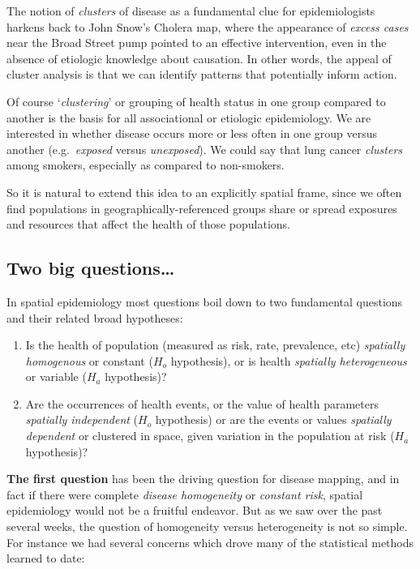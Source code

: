 \documentclass[
]{book}
\providecommand{\tightlist}{%
  \setlength{\itemsep}{0pt}\setlength{\parskip}{0pt}}
\begin{document}
The notion of \emph{clusters} of disease as a fundamental clue for epidemiologists harkens back to John Snow's Cholera map, where the appearance of \emph{excess cases} near the Broad Street pump pointed to an effective intervention, even in the absence of etiologic knowledge about causation. In other words, the appeal of cluster analysis is that we can identify patterns that potentially inform action.

Of course `\emph{clustering}' or grouping of health status in one group compared to another is the basis for all associational or etiologic epidemiology. We are interested in whether disease occurs more or less often in one group versus another (e.g.~\emph{exposed} versus \emph{unexposed}). We could say that lung cancer \emph{clusters} among smokers, especially as compared to non-smokers.

So it is natural to extend this idea to an explicitly spatial frame, since we often find populations in geographically-referenced groups share or spread exposures and resources that affect the health of those populations.

\hypertarget{two-big-questions}{%
\subsection{Two big questions\ldots{}}\label{two-big-questions}}

In spatial epidemiology most questions boil down to two fundamental questions and their related broad hypotheses:

\begin{enumerate}
\def\labelenumi{\arabic{enumi}.}
\tightlist
\item
  Is the health of population (measured as risk, rate, prevalence, etc) \emph{spatially homogenous} or constant (\(H_o\) hypothesis), or is health \emph{spatially heterogeneous} or variable (\(H_a\) hypothesis)?
\item
  Are the occurrences of health events, or the value of health parameters \emph{spatially independent} (\(H_o\) hypothesis) or are the events or values \emph{spatially dependent} or clustered in space, given variation in the population at risk (\(H_a\) hypothesis)?
\end{enumerate}

\textbf{The first question} has been the driving question for disease mapping, and in fact if there were complete \emph{disease homogeneity} or \emph{constant risk}, spatial epidemiology would not be a fruitful endeavor. But as we saw over the past several weeks, the question of homogeneity versus heterogeneity is not so simple. For instance we had several concerns which drove many of the statistical methods learned to date:
\end{document}
